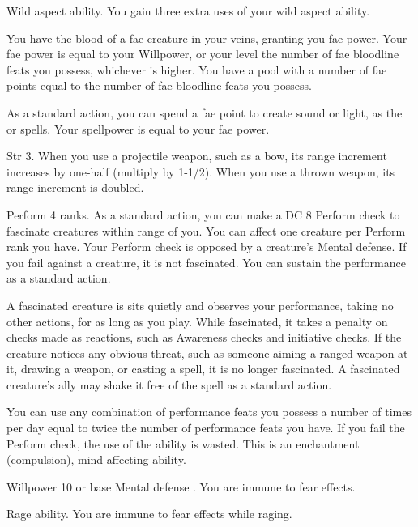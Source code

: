 \featpre Wild aspect ability.
\featben You gain three extra uses of your wild aspect ability.

\featben You have the blood of a fae creature in your veins, granting you fae power.
Your fae power is equal to your Willpower, or your level \add the number of fae bloodline feats you possess, whichever is higher.
You have a pool with a number of fae points equal to the number of fae bloodline feats you possess.

As a standard action, you can spend a fae point to create sound or light, as the  or  spells.
Your spellpower is equal to your fae power.

\featpre Str 3.
\featben When you use a projectile weapon, such as a bow, its range increment increases by one-half (multiply by 1-1/2).
When you use a thrown weapon, its range increment is doubled.

\featpre Perform 4 ranks.
\featben As a standard action, you can make a DC 8 Perform check to fascinate creatures within \rngmed range of you.
You can affect one creature per Perform rank you have.
Your Perform check is opposed by a creature's Mental defense.
If you fail against a creature, it is not fascinated.
You can sustain the performance as a standard action.

A fascinated creature is sits quietly and observes your performance, taking no other actions, for as long as you play.
While fascinated, it takes a  penalty on checks made as reactions, such as Awareness checks and initiative checks.
If the creature notices any obvious threat, such as someone aiming a ranged weapon at it, drawing a weapon, or casting a spell, it is no longer fascinated.
A fascinated creature's ally may shake it free of the spell as a standard action.

You can use any combination of performance feats you possess a number of times per day equal to twice the number of performance feats you have.
If you fail the Perform check, the use of the ability is wasted.
This is an enchantment (compulsion), mind-affecting ability.

\featpre Willpower 10 or base Mental defense .
\featben You are immune to fear effects.

\featpre Rage ability.
\featben You are immune to fear effects while raging.

